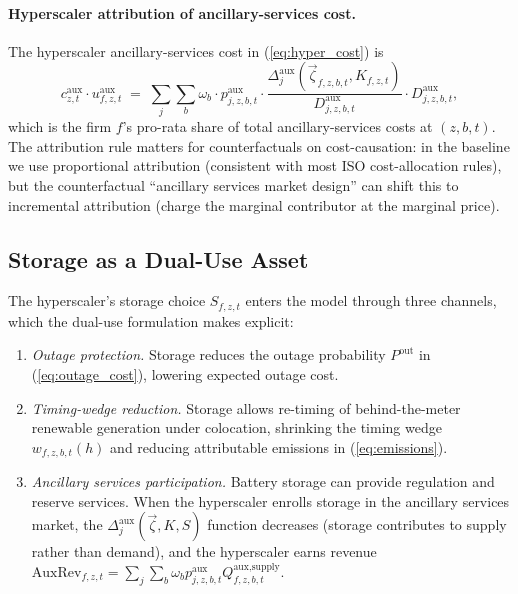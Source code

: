 \documentclass[12pt,letterpaper]{article}
\begin{document}
\paragraph{Hyperscaler attribution of ancillary-services cost.} The hyperscaler
ancillary-services cost in (\ref{eq:hyper_cost}) is
\begin{equation}
\label{eq:hyper_aux_cost}
c^{\mathrm{aux}}_{z,t} \cdot u^{\mathrm{aux}}_{f,z,t} \;=\;
\sum_j \sum_b \omega_b \cdot p^{\text{aux}}_{j,z,b,t} \cdot
\frac{\Delta^{\text{aux}}_j(\vec\zeta_{f,z,b,t}, K_{f,z,t})}{D^{\text{aux}}_{j,z,b,t}}
\cdot D^{\text{aux}}_{j,z,b,t},
\end{equation}
which is the firm $f$'s pro-rata share of total ancillary-services costs at
$(z,b,t)$. The attribution rule matters for counterfactuals on
cost-causation: in the baseline we use proportional attribution (consistent
with most ISO cost-allocation rules), but the counterfactual ``ancillary
services market design'' can shift this to incremental attribution (charge
the marginal contributor at the marginal price).

\subsection{Storage as a Dual-Use Asset}
\label{sec:storage_dual}

The hyperscaler's storage choice $S_{f,z,t}$ enters the model through
three channels, which the dual-use formulation makes explicit:

\begin{enumerate}[leftmargin=*]
    \item \emph{Outage protection.} Storage reduces the outage probability
    $P^{\mathrm{out}}$ in (\ref{eq:outage_cost}), lowering expected outage
    cost.
    \item \emph{Timing-wedge reduction.} Storage allows re-timing of
    behind-the-meter renewable generation under colocation, shrinking the
    timing wedge $w_{f,z,b,t}(h)$ and reducing attributable emissions in
    (\ref{eq:emissions}).
    \item \emph{Ancillary services participation.} Battery storage can
    provide regulation and reserve services. When the hyperscaler enrolls
    storage in the ancillary services market, the
    $\Delta^{\text{aux}}_j(\vec\zeta, K, S)$ function decreases (storage
    contributes to supply rather than demand), and the hyperscaler earns
    revenue $\text{AuxRev}_{f,z,t} = \sum_j \sum_b \omega_b p^{\text{aux}}_{j,z,b,t}
    Q^{\text{aux,supply}}_{f,z,b,t}$.
\end{enumerate}
\end{document}
